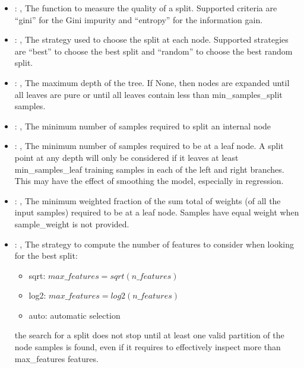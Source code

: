 \begin{itemize}
    \item {}: , 
      The function to measure the quality of a split. Supported criteria are ``gini'' for the
      Gini impurity and ``entropy'' for the information gain.

    \item {}: , 
      The strategy used to choose the split at each node. Supported strategies are ``best''
      to choose the best split and ``random'' to choose the best random split.

    \item {}: , 
      The maximum depth of the tree. If None, then nodes are expanded until all leaves are pure
      or until all leaves contain less than min\_samples\_split samples.

    \item {}: , 
      The minimum number of samples required to split an internal node

    \item {}: , 
      The minimum number of samples required to be at a leaf node. A split point at any
      depth will only be considered if it leaves at least min\_samples\_leaf training samples in
      each                                                  of the left and right branches. This may
      have the effect of smoothing the model, especially
      in regression.

    \item {}: , 
      The minimum weighted fraction of the sum total of weights (of all the input samples)
      required to be at a leaf node. Samples have equal weight when sample\_weight is not provided.

    \item {}: , 
      The strategy to compute the number of features to consider when looking for the best split:
      \begin{itemize}                                                     \item sqrt:
      $max\_features=sqrt(n\_features)$                                                     \item
      log2: $max\_features=log2(n\_features)$
      \item auto: automatic selection
      \end{itemize}                                                   \nb the search for a split
      does not stop until at least one valid partition of the node
      samples is found, even if it requires to effectively inspect more than max\_features features.


\end{itemize}
